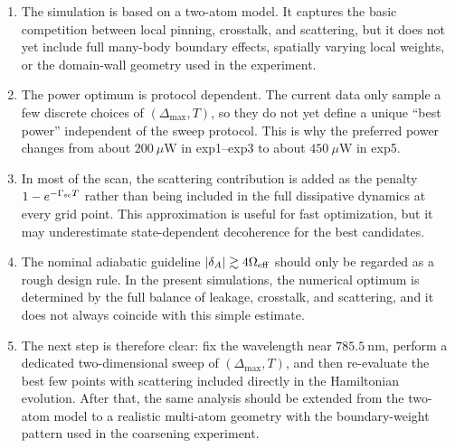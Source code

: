 \documentclass[aps,%
onecolumn,%
floatfix,%
pra,%
amsfonts,%
longbibliography,%
groupedaddress,%
superscriptaddress]{revtex4-2}%
\newcommand{\1}{\mathbbm{1}}
\begin{document}
\begin{enumerate}[label=(\alph*)]
    \item The simulation is based on a two-atom model. It captures the basic
    competition between local pinning, crosstalk, and scattering, but it does
    not yet include full many-body boundary effects, spatially varying local
    weights, or the domain-wall geometry used in the experiment.

    \item The power optimum is protocol dependent. The current data only sample
    a few discrete choices of $(\Delta_{\max},T)$, so they do not yet define a
    unique ``best power'' independent of the sweep protocol. This is why the
    preferred power changes from about $200~\mu\mathrm{W}$ in exp1--exp3 to
    about $450~\mu\mathrm{W}$ in exp5.

    \item In most of the scan, the scattering contribution is added as the
    penalty $1-e^{-\Gamma_{\rm sc}T}$ rather than being included in the full
    dissipative dynamics at every grid point. This approximation is useful for
    fast optimization, but it may underestimate state-dependent decoherence for
    the best candidates.

    \item The nominal adiabatic guideline
    $|\delta_A| \gtrsim 4\Omega_{\rm eff}$ should only be regarded as a rough
    design rule. In the present simulations, the numerical optimum is
    determined by the full balance of leakage, crosstalk, and scattering, and
    it does not always coincide with this simple estimate.

    \item The next step is therefore clear: fix the wavelength near
    $785.5~\mathrm{nm}$, perform a dedicated two-dimensional sweep of
    $(\Delta_{\max},T)$, and then re-evaluate the best few points with
    scattering included directly in the Hamiltonian evolution. After that, the
    same analysis should be extended from the two-atom model to a realistic
    multi-atom geometry with the boundary-weight pattern used in the
    coarsening experiment.
\end{enumerate}



\appendix
\end{document}
